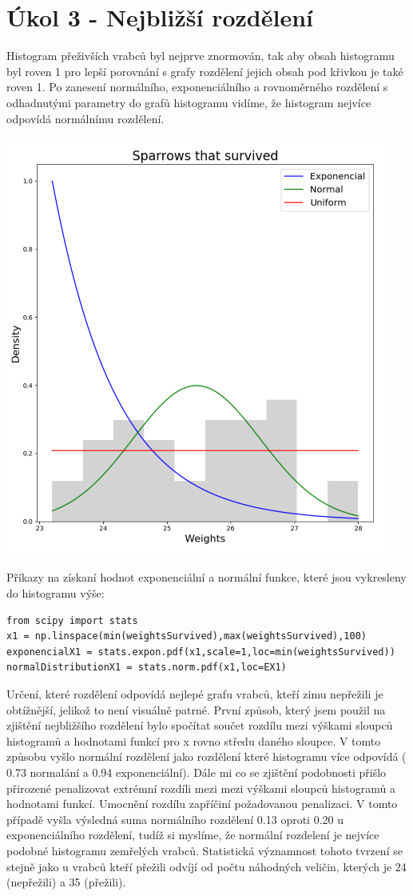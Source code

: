 \documentclass[12pt,a4paper]{article}
\begin{document}
\section{Úkol 3 - Nejbližší rozdělení}
Histogram přeživších vrabců byl nejprve znormován, tak aby obsah histogramu byl roven 1 pro lepší porovnání s grafy rozdělení jejich obsah pod křivkou je také roven 1. Po zanesení normálního, exponenciálního a rovnoměrného rozdělení s odhadnutými parametry do grafů histogramu vidíme, že histogram nejvíce odpovídá normálnímu rozdělení.
\begin{center}
\includegraphics[width=5in]{3_survived}
\end{center}
Příkazy na získaní hodnot exponenciální a normální funkce, které jsou vykresleny do histogramu výše:\par \medskip
\begin{lstlisting}
from scipy import stats
x1 = np.linspace(min(weightsSurvived),max(weightsSurvived),100)
exponencialX1 = stats.expon.pdf(x1,scale=1,loc=min(weightsSurvived))
normalDistributionX1 = stats.norm.pdf(x1,loc=EX1)
\end{lstlisting}
\pagebreak
Určení, které rozdělení odpovídá nejlepé grafu vrabců, kteří zimu nepřežili je obtížnější, jelikož to není visuálně patrné. První způsob, který jsem použil na zjištění nejbližšího rozdělení bylo spočítat součet rozdílu mezi výškami sloupců histogramů a hodnotami funkcí pro x rovno středu daného sloupce. V tomto způsobu vyšlo normální rozdělení jako rozdělení které histogramu více odpovídá ( 0.73 normalání a 0.94 exponenciální). Dále mi co se zjištění podobnosti přišlo přirozené penalizovat extrémní rozdíli  mezi mezi výškami sloupců histogramů a hodnotami funkcí. Umocnění rozdílu zapříčiní požadovanou penalizaci. V tomto případě vyšla výsledná suma normálního rozdělení 0.13 oproti 0.20 u exponenciálního rozdělení, tudíž si myslíme, že normální rozdelení je nejvíce podobné histogramu zemřelých vrabců. Statistická významnost tohoto tvrzení se stejně jako u vrabců kteří přežili odvíjí od počtu náhodných veličin, kterých je 24 (nepřežili) a 35 (přežili).
\end{document}
